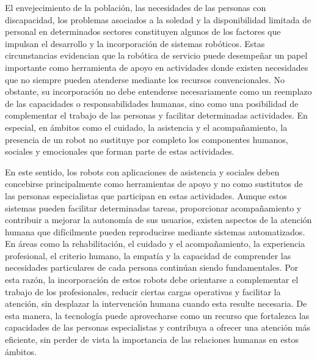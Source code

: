 \documentclass[11pt,a4paper]{article}
\begin{document}
El envejecimiento de la población, las necesidades de las personas con discapacidad, los problemas asociados a la soledad y la disponibilidad limitada de personal en determinados sectores constituyen algunos de los factores que impulsan el desarrollo y la incorporación de sistemas robóticos. Estas circunstancias evidencian que la robótica de servicio puede desempeñar un papel importante como herramienta de apoyo en actividades donde existen necesidades que no siempre pueden atenderse mediante los recursos convencionales. No obstante, su incorporación no debe entenderse necesariamente como un reemplazo de las capacidades o responsabilidades humanas, sino como una posibilidad de complementar el trabajo de las personas y facilitar determinadas actividades. En especial, en ámbitos como el cuidado, la asistencia y el acompañamiento, la presencia de un robot no sustituye por completo los componentes humanos, sociales y emocionales que forman parte de estas actividades. 

En este sentido, los robots con aplicaciones de asistencia y sociales deben concebirse principalmente como herramientas de apoyo y no como sustitutos de las personas especialistas que participan en estas actividades. Aunque estos sistemas pueden facilitar determinadas tareas, proporcionar acompañamiento y contribuir a mejorar la autonomía de sus usuarios, existen aspectos de la atención humana que difícilmente pueden reproducirse mediante sistemas automatizados. En áreas como la rehabilitación, el cuidado y el acompañamiento, la experiencia profesional, el criterio humano, la empatía y la capacidad de comprender las necesidades particulares de cada persona continúan siendo fundamentales. Por esta razón, la incorporación de estos robots debe orientarse a complementar el trabajo de los profesionales, reducir ciertas cargas operativas y facilitar la atención, sin desplazar la intervención humana cuando esta resulte necesaria. De esta manera, la tecnología puede aprovecharse como un recurso que fortalezca las capacidades de las personas especialistas y contribuya a ofrecer una atención más eficiente, sin perder de vista la importancia de las relaciones humanas en estos ámbitos.
\end{document}
